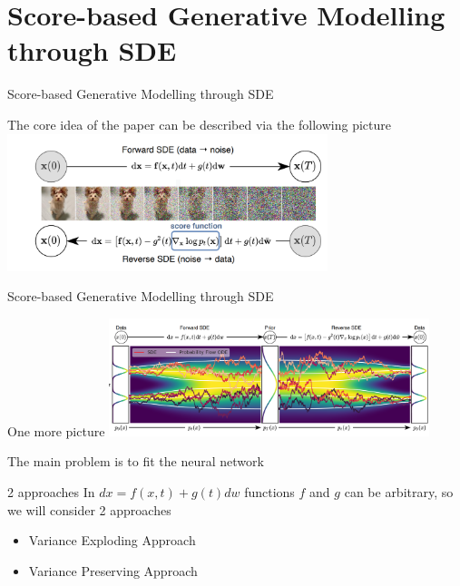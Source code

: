 \documentclass[xcolor=dvipsnames]{beamer}
\begin{document}
    \section{Score-based Generative Modelling through SDE} 
    \begin{frame}{Score-based Generative Modelling through SDE}
        \begin{center}
            The core idea of the paper can be described via the following picture
            \includegraphics[width=0.7\textwidth]{pics/NoiseDenoise.png}
        \end{center}
    \end{frame}

    \begin{frame}{Score-based Generative Modelling through SDE}
        \begin{center}
            One more picture
            \includegraphics[width=0.7\textwidth]{pics/NoiseDenoise2.png}
        \end{center}
        The main problem is to fit the neural network 
    \end{frame}

    \begin{frame}{2 approaches}
        In $dx = f(x, t) + g(t) d w$ functions $f$ and $g$ can be arbitrary, so we will consider 2 approaches
        \begin{itemize}
            \item Variance Exploding Approach
            \item Variance Preserving Approach
        \end{itemize}
    \end{frame}
\end{document}
